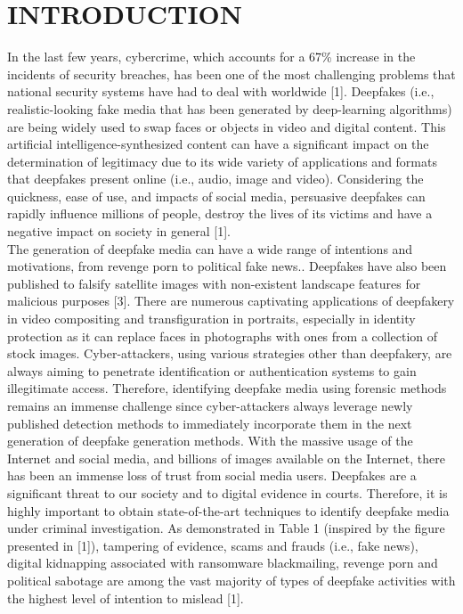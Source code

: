 \documentclass[12 pt]{article}
\begin{document}
\section{INTRODUCTION}
In the last few years, cybercrime, which accounts for a 67\% increase in the incidents of security breaches, has been one of the most challenging problems that national security systems have had to deal with worldwide [1].
Deepfakes (i.e., realistic-looking fake media that has been generated by deep-learning algorithms) are being widely used to swap faces or objects in video and digital content. This artificial intelligence-synthesized
content can have a significant impact on the determination of legitimacy due to its wide variety of applications and formats that deepfakes present online (i.e., audio, image and video).
Considering the quickness, ease of use, and impacts of social media, persuasive deepfakes can rapidly influence millions of people, destroy the lives of its victims and have a negative impact on society in general [1].
\\ The generation of deepfake media can have a wide range of intentions and motivations, from revenge porn to political fake news..
Deepfakes have also been published to falsify satellite images with non-existent landscape features for malicious purposes [3].
There are numerous captivating applications of deepfakery in video compositing and transfiguration in portraits, especially in identity protection as it can replace faces in photographs with ones from a collection of stock images.
Cyber-attackers, using various strategies other than deepfakery, are always aiming to penetrate identification or authentication systems to gain illegitimate access. Therefore, identifying deepfake media using forensic methods remains
an immense challenge since cyber-attackers always leverage newly published detection methods to immediately incorporate them in the next generation of deepfake generation methods. With the massive usage of the Internet and social media,
and billions of images available on the Internet, there has been an immense loss of trust from social media users. Deepfakes are a significant threat to our society and to digital evidence in courts. Therefore, it is highly important to
obtain state-of-the-art techniques to identify deepfake media under criminal investigation.
As demonstrated in Table 1 (inspired by the figure presented in [1]), tampering of evidence, scams and frauds (i.e., fake news), digital kidnapping associated with ransomware blackmailing, revenge porn and political sabotage are among the
vast majority of types of deepfake activities with the highest level of intention to mislead [1].
\newpage
\end{document}
